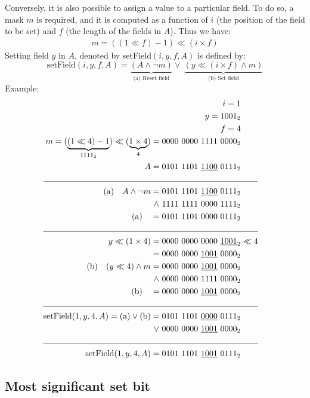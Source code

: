 Conversely, it is also possible to assign a value to a particular field. To do so, a mask $m$ is required, and it is computed as a function of $i$ (the position of the field to be set) and $f$ (the length of the fields in $A$). Thus we have:
\begin{align*}
    m = ((1 \ll f) - 1) \ll (i \times f)
\end{align*}
 Setting field $y$ in $A$, denoted by setField$(i, y, f, A)$ is defined by:
\begin{equation*}
    \text{setField}(i, y, f, A) = \underbrace{(A \wedge \neg m)}_{\text{(a) Reset field}} \vee \ \underbrace{(y \ll (i \times f) \wedge m)}_{\text{(b) Set field}}
\end{equation*}
Example:
\begin{align*}
    i = 1\\
    y = 1001_2\\
    f = 4\\
    m = (\underbrace{(1 \ll 4)  - 1} _{1111_2}) \ll (\underbrace{1 \times 4}_{4}) = 0000\ 0000\ 1111\ 0000_2\\
    A = 0101\ 1101\ \underline{1100}\ 0111_2& \\
    \cline{1-2}
    \text{(a)}\quad A \wedge \neg m = 0101\ 1101\ \underline{1100}\ 0111_2 \\
    \wedge\ 1111\ 1111\ 0000\ 1111_2\\
    \text{(a)}\quad = 0101\ 1101\ 0000\ 0111_2\\
    \cline{1-2}
    y \ll (1 \times 4) = 0000\ 0000\ 0000\ \underline{1001}_2& \ll 4\\
    = 0000\ 0000\ \underline{1001}\ 0000_2\\
    \text{(b)}\quad (y \ll 4) \wedge m = 0000\ 0000\ \underline{1001}\ 0000_2\\ 
    \wedge\ 0000\ 0000\ 1111\ 0000_2\\
    \text{(b)}\quad = 0000\ 0000\ \underline{1001}\ 0000_2\\
    \cline{1-2}
    \text{setField}(1, y, 4, A) = \text{(a)} \vee \text{(b)} = 0101\ 1101\ \underline{0000}\ 0111_2\\
    \vee\ 0000\ 0000\ \underline{1001}\ 0000_2 \\
    \cline{1-2}
    \text{setField}(1, y, 4, A) = 0101\ 1101\ \underline{1001}\ 0111_2&
\end{align*}

\subsection{Most significant set bit} \label{sec:msbAlgorithm}

